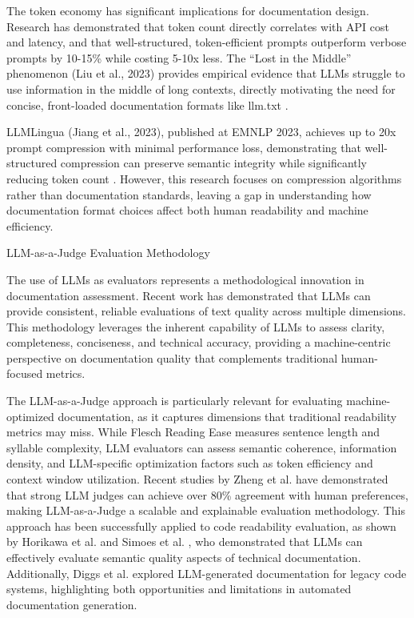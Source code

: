 \documentclass[10pt,conference,a4paper]{IEEEtran}
\makeatletter
\let\oldsubsection\subsection
\renewcommand{\subsection}{%
    \@ifstar{\subsectionStar}{\subsectionNoStar}%
}
\newcommand{\subsectionStar}[1]{%
    \oldsubsection*{\textit{#1}}%
    \vspace{-3pt}%
}
\newcommand{\subsectionNoStar}[1]{%
    \oldsubsection{\textit{#1}}%
    \vspace{-3pt}%
}
\makeatother
\begin{document}
The token economy has significant implications for documentation design. Research has demonstrated that token count directly correlates with API cost and latency, and that well-structured, token-efficient prompts outperform verbose prompts by 10-15\% while costing 5-10x less. The ``Lost in the Middle'' phenomenon (Liu et al., 2023) provides empirical evidence that LLMs struggle to use information in the middle of long contexts, directly motivating the need for concise, front-loaded documentation formats like llm.txt \cite{Liu2023}.

LLMLingua (Jiang et al., 2023), published at EMNLP 2023, achieves up to 20x prompt compression with minimal performance loss, demonstrating that well-structured compression can preserve semantic integrity while significantly reducing token count \cite{Jiang2023}. However, this research focuses on compression algorithms rather than documentation standards, leaving a gap in understanding how documentation format choices affect both human readability and machine efficiency.

\subsection{LLM-as-a-Judge Evaluation Methodology}

The use of LLMs as evaluators represents a methodological innovation in documentation assessment. Recent work has demonstrated that LLMs can provide consistent, reliable evaluations of text quality across multiple dimensions. This methodology leverages the inherent capability of LLMs to assess clarity, completeness, conciseness, and technical accuracy, providing a machine-centric perspective on documentation quality that complements traditional human-focused metrics.

The LLM-as-a-Judge approach is particularly relevant for evaluating machine-optimized documentation, as it captures dimensions that traditional readability metrics may miss. While Flesch Reading Ease measures sentence length and syllable complexity, LLM evaluators can assess semantic coherence, information density, and LLM-specific optimization factors such as token efficiency and context window utilization. Recent studies by Zheng et al. \cite{Zheng2023} have demonstrated that strong LLM judges can achieve over 80\% agreement with human preferences, making LLM-as-a-Judge a scalable and explainable evaluation methodology. This approach has been successfully applied to code readability evaluation, as shown by Horikawa et al. \cite{Horikawa2026} and Simoes et al. \cite{Simoes2025}, who demonstrated that LLMs can effectively evaluate semantic quality aspects of technical documentation. Additionally, Diggs et al. \cite{Diggs2024} explored LLM-generated documentation for legacy code systems, highlighting both opportunities and limitations in automated documentation generation.
\end{document}
